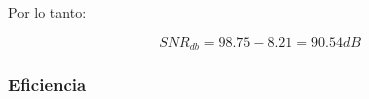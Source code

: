 			Por lo tanto: 

			\begin{equation*}
			SNR_{db}  = 98.75 - 8.21 = 90.54 dB  
			\end{equation*}

			\subsubsection{Eficiencia}


%		
%
%
